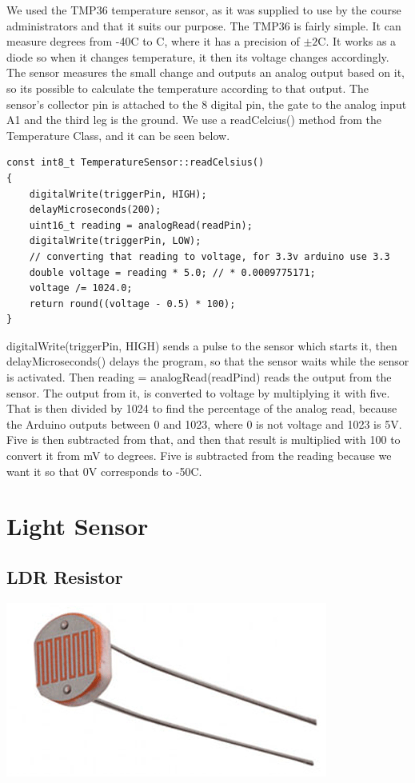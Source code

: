 \documentclass[a4paper,12pt,twoside,openright,titlepage]{book}
\begin{document}
We used the TMP36 temperature sensor, as it was supplied to use by the course administrators and that it suits our purpose. The TMP36 is fairly simple. It can measure degrees from -40\textdegree{}C to C, where it has a precision\cite{tmpTutorial} of $\pm2$\textdegree{}C. It works as a diode so when it changes temperature, it then its voltage changes accordingly. The sensor measures the small change and outputs an analog output based on it, so its possible to calculate the temperature according to that output. 
The sensor's collector pin is attached to the 8 digital pin, the gate to the analog input A1 and the third leg is the ground.
We use a readCelcius() method from the Temperature Class, and it can be seen below.
\begin{lstlisting}[language=Arduino]
const int8_t TemperatureSensor::readCelsius()
{
    digitalWrite(triggerPin, HIGH);
    delayMicroseconds(200);
    uint16_t reading = analogRead(readPin);
    digitalWrite(triggerPin, LOW);
    // converting that reading to voltage, for 3.3v arduino use 3.3
    double voltage = reading * 5.0; // * 0.0009775171;
    voltage /= 1024.0;
    return round((voltage - 0.5) * 100);
}
\end{lstlisting}
digitalWrite(triggerPin, HIGH) sends a pulse to the sensor which starts it, then delayMicroseconds() delays the program, so that the sensor waits while the sensor is activated. Then reading = analogRead(readPind) reads the output from the sensor. The output from it, is converted to voltage by multiplying it with five. That is then divided by 1024 to find the percentage of the analog read, because the Arduino outputs between 0 and 1023, where 0 is not voltage and 1023 is 5V. Five is then subtracted from that, and then that result is multiplied with 100 to convert it from mV to degrees. Five is subtracted from the reading because we want it so that 0V corresponds to -50\textdegree{}C. 

\section{Light Sensor}
\subsection{LDR Resistor}

\begin{center}
	\includegraphics[scale=0.80]{LDR-Resistor}
\end{center}
\end{document}
